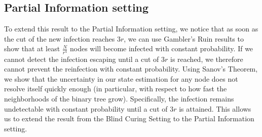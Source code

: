\subsection{Partial Information setting}
To extend this result to the Partial Information setting, we notice that as soon as the cut of the new infection reaches $3r$, we can use Gambler's Ruin results to show that at least $\frac{N}{r^4}$ nodes will become infected with constant probability. If we cannot detect the infection escaping until a cut of $3r$ is reached, we therefore cannot prevent the reinfection with constant probability. Using Sanov's Theorem, we show that the uncertainty in our state estimation for any node does not resolve itself quickly enough (in particular, with respect to how fast the neighborhoods of the binary tree grow). Specifically, the infection remains undetectable with constant probability until a cut of $3r$ is attained. This allows us to extend the result from the Blind Curing Setting to the Partial Information setting.
